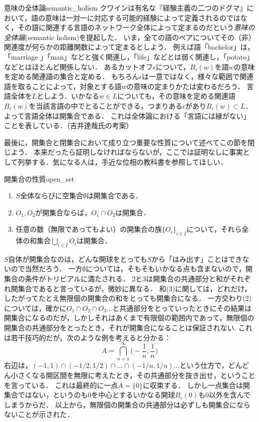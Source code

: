 \documentclass[11pt,a4paper, dvipdfmx]{jsarticle}
\begin{document}
\begin{rei}{意味の全体論}{semantic_holism}
クワインは有名な『経験主義の二つのドグマ』において，語の意味は一対一に対応する可能的経験によって定義されるのではなく，その語に関連する言語のネットワーク全体によって定まるのだという\emph{意味の全体論}(semantic holism)を提起した．
いま，全ての語のペアについてその（非）関連度が何らかの距離関数によって定まるとしよう．
例えば語「bachelor」は，「marriage 」「man」などと強く関連し，「life」などとは弱く関連し，「potato」などとはほとんど関係しない．
あるカットオフ$\epsilon$について，$B_\epsilon(w)$を語$w$の意味を定める関連語の集合と定める．
もちろん$\epsilon$は一意ではなく，様々な範囲で関連語を取ることによって，対象とする語$w$の意味の定まりかたは変わるだろう．
言語全体を$L$としよう．いかなる$w \in L$についても，その意味を定める関連語$B_\epsilon(w)$を当該言語の中でとることができる，つまりある$\epsilon$があり$B_\epsilon(w) \subset L$．
よって言語全体は開集合である．
これは全体論における「言語には縁がない」ことを表している．（吉井達哉氏の考案）
\end{rei}

最後に，開集合と閉集合において成り立つ重要な性質について述べてこの節を閉じよう．
本来だったら証明しなければならないが，ここでは証明なしに事実として列挙する．気になる人は，手近な位相の教科書を参照してほしい．

\begin{prop}{開集合の性質}{open_set}
\begin{enumerate}
 \item $S$全体ならびに空集合$\emptyset$は開集合である．
 \item $O_1, O_2$が開集合ならば，$O_1 \cap O_2$は開集合．
 \item 任意の数（無限であってもよい）の開集合の族$\{ O_i \}_{i \in I}$について，それら全体の和集合$\bigcup_{i \in I} O_i$は開集合．
\end{enumerate}
\end{prop}

$S$自体が開集合なのは，どんな開球をとっても$S$から「はみ出す」ことはできないので当然だろう．
一方$\emptyset$については，そもそもいかなる点も含まないので，開集合の条件がトリビアルに満たされる．
2と3は開集合の共通部分と和がそれぞれ開集合であると言っているが，微妙に異なる．
和(3)に関しては，どれだけ，したがってたとえ無限個の開集合の和をとっても開集合になる．
一方交わり(2)については，確かに$O_1 \cap O_2 \cap O_3 \dots$と共通部分をとっていったときにその結果は開集合になるのだが，しかしそれはあくまで有限個の範囲内であって，無限個の開集合の共通部分をとったとき，それが開集合になることは保証されない.
これは若干技巧的だが，次のような例を考えると分かる：
\[ A = \bigcap_{n=1}^{\infty} \bigg( -\frac{1}{n}, \frac{1}{n} \bigg) \]
右辺は，$(-1, 1) \cap (-1/2, 1/2) \cap \dots \cap (-1/n,1/n) \dots$という仕方で，どんどん小さくなる開区間を無限に考えたとき，その共通部分を抜き出せ，ということを言っている．
これは最終的に一点$A=\{0\}$に収束する．
しかし一点集合は開集合ではない，というのも0を中心とするいかなる開球$B_\epsilon(0)$も0以外を含んでしまうからだ．
以上から，無限個の開集合の共通部分は必ずしも開集合にならないことが示された．
\end{document}
